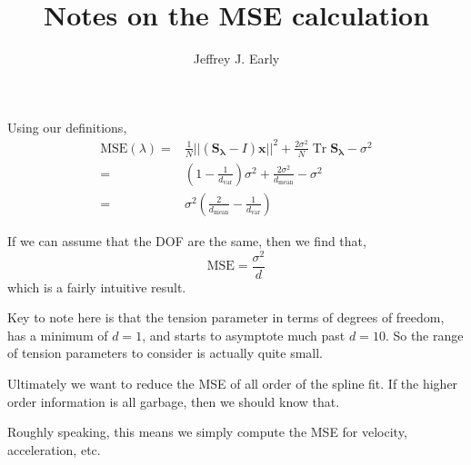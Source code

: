 \documentclass[11pt]{article}
\title{Notes on the MSE calculation}
\author{Jeffrey J. Early}
\DeclareMathOperator{\Tr}{Tr}
\begin{document}
\maketitle

Using our definitions,
\begin{align}
    \textrm{MSE}(\lambda) =& \frac{1}{N} || \left( \mathbf{S_\lambda} - I \right) \mathbf{x} ||^2 + \frac{2 \sigma^2}{N}  \Tr \mathbf{S_\lambda} - \sigma^2 \\
    =&  \left(1-\frac{1}{d_{\textrm{var}}} \right)\sigma^2 + \frac{2 \sigma^2}{d_\textrm{mean}} - \sigma^2 \\
    =& \sigma^2 \left( \frac{2}{d_\textrm{mean}} -\frac{1}{d_{\textrm{var}}} \right)
\end{align}

If we can assume that the DOF are the same, then we find that,
\begin{equation}
    \textrm{MSE} = \frac{\sigma^2}{d}
\end{equation}
which is a fairly intuitive result.

Key to note here is that the tension parameter in terms of degrees of freedom, has a minimum of $d=1$, and starts to asymptote much past $d=10$. So the range of tension parameters to consider is actually quite small.

Ultimately we want to reduce the MSE of all order of the spline fit. If the higher order information is all garbage, then we should know that.

Roughly speaking, this means we simply compute the MSE for velocity, acceleration, etc.
\end{document}
